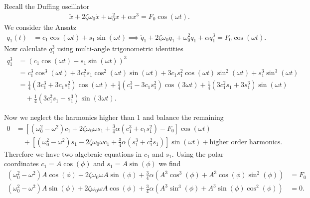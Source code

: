 \begin{ex}
	Recall the Duffing oscillator
\begin{align}
	\ddot{x} + 2 \zeta \omega_0 \dot{x} + \omega_0^2  x + \alpha x^3 = F_0 \cos(\omega t).
\end{align}
We consider the Ansatz 
\begin{align}
	q_1(t) &= c_1 \cos(\omega t) + s_1 \sin(\omega t) \implies
	\ddot{q}_1 + 2 \zeta \omega_0 \dot{q}_1 + \omega_0^2 q_{1} + \alpha q_{1}^{3} = F_0 \cos(\omega t). 
\end{align}
Now calculate $q_1^3$ using multi-angle trigonometric identities
\begin{subequations}
 \begin{align}
	 q_1^{3} &= \left( c_1 \cos (\omega t) + s_1 \sin(\omega t)\right)^{3} \\
		 &= c_{1}^{3} \cos^{3}(\omega t) + 3 c_1^2 s_1 \cos^{2}(\omega t)\sin(\omega t) + 3 c_1 s_{1}^{2}\cos(\omega t) \sin^2(\omega t) +s_1^{3}\sin^{3}(\omega t) \\
		 &= \frac{1}{4} \left(3 c_1^3 + 3 c_1 s_1^2\right) \cos(\omega t) + \frac{1}{4} \left(c_1^3 - 3 c_1 s_1^2\right) \cos(3 \omega t) + \frac{1}{4} \left(3 c_1^2 s_1 + 3 s_1^3\right) \sin(\omega t) \\
		 &\quad + \frac{1}{4} \left(3 c_1^2 s_1 - s_1^3\right) \sin(3 \omega t). 
\end{align}
\end{subequations}
\end{ex}
Now we neglect the harmonics higher than 1 and balance the remaining
\begin{subequations}
\begin{align}
	0&=	\left[\left(\omega _0^2 - \omega^2\right) c_1 + 2 \zeta \omega_0 \omega s_1 + \frac{3}{4} \alpha \left(c_1^3 + c_1 s_1^2\right) - F_0 \right] \cos(\omega t)  \\
	 &\quad + \left[ \left( \omega_0^2 - \omega^2 \right) s_1 - 2 \zeta \omega_0 \omega c_1 + \frac{3}{4} \alpha \left(s_1^3 + c_1^2 s_1\right) \right] \sin(\omega t) +  \textrm{higher order harmonics}.  
\end{align}
\end{subequations}
Therefore we have two algebraic equations in $c_1$ and $s_1$. Using the polar coordinates $c_1 = A \cos(\phi)$ and $s_1 = A \sin(\phi)$ we find
\begin{subequations}
\begin{align}
	\left( \omega _0^2 - \omega ^2\right) A \cos(\phi) + 2 \zeta \omega_0 \omega A \sin (\phi) + \frac{3}{4} \alpha \left( A^3 \cos^3(\phi) + A^3 \cos(\phi) \sin^2(\phi) \right) &= F_0\\
	\left( \omega _0^2 - \omega ^2\right) A \sin(\phi) + 2 \zeta \omega_0 \omega A \cos (\phi) + \frac{3}{4} \alpha \left( A^3 \sin^3(\phi) + A^3 \sin(\phi) \cos^2(\phi) \right) &= 0.
\end{align}
\end{subequations}
